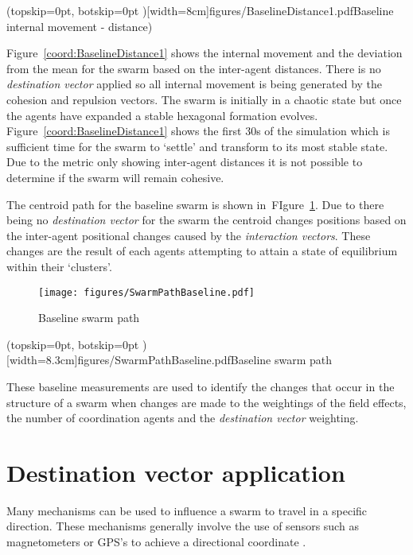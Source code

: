 \documentclass{ieeeaccess}
\begin{document}

\Figure[t!](topskip=0pt, botskip=0pt )[width=8cm]{figures/BaselineDistance1.pdf}{Baseline internal movement - distance)\label{coord:BaselineDistance1}}

Figure~\ref{coord:BaselineDistance1} shows the internal movement and the deviation from the mean for the swarm based on the inter-agent distances. There is no \textit{destination vector} applied so all internal movement is being generated by the cohesion and repulsion vectors. The swarm is initially in a chaotic state but once the agents have expanded a stable hexagonal formation evolves. Figure~\ref{coord:BaselineDistance1} shows the first 30s of the simulation which is sufficient time for the swarm to `settle' and transform to its most stable state. Due to the metric only showing inter-agent distances it is not possible to determine if the swarm will remain cohesive.

The centroid path for the baseline swarm is shown in~FIgure~\ref{coord:SwarmPathBaseline1}. Due to there being no \textit{destination vector} for the swarm the centroid changes positions based on the inter-agent positional changes caused by the \textit{interaction vectors}. These changes are the result of each agents attempting to attain a state of equilibrium within their `clusters'.

\begin{figure}
\begin{center}
\texttt{[image: figures/SwarmPathBaseline.pdf]}
\end{center}
\caption{Baseline swarm path\label{coord:SwarmPathBaseline1}}
\end{figure}

\Figure[t!](topskip=0pt, botskip=0pt )[width=8.3cm]{figures/SwarmPathBaseline.pdf}{Baseline swarm path\label{coord:SwarmPathBaseline1}}

These baseline measurements are used to identify the changes that occur in the structure of a swarm when changes are made to the weightings of the field effects, the number of coordination agents and the \textit{destination vector} weighting.

\section{Destination vector application}\label{sec:DestinationApp}
Many mechanisms can be used to influence a swarm to travel in a specific direction. These mechanisms generally involve the use of sensors such as magnetometers or GPS's to achieve a directional coordinate \cite{SG:15,TG:12}. 
\end{document}
